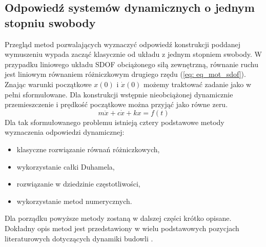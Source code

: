 
\subsection{Odpowiedź systemów dynamicznych o jednym stopniu swobody} \label{section: sdof_response}

Przegląd metod pozwalających wyznaczyć odpowiedź konstrukcji poddanej wymuszeniu wypada zacząć klasycznie od układu z jednym stopniem swobody. W przypadku liniowego układu SDOF obciążonego siłą zewnętrzną, równanie ruchu jest liniowym równaniem różniczkowym drugiego rzędu (\ref{eq: eq_mot_sdof}). Znając warunki początkowe $x(0)$ i $\dot{x}(0)$ możemy traktować zadanie jako w pełni sformułowane. Dla konstrukcji wstępnie nieobciążonej dynamicznie przemieszczenie i prędkość początkowe można przyjąć jako równe zeru.
\begin{equation} \label{eq: eq_mot_sdof}
	m\ddot{x}+c\dot{x}+k{x}=f(t)
\end{equation}
Dla tak sformułowanego problemu istnieją cztery podstawowe metody wyznaczenia odpowiedzi dynamicznej:
\begin{itemize}
	\item klasyczne rozwiązanie równań różniczkowych,
	\item wykorzystanie całki Duhamela,
	\item rozwiązanie w dziedzinie częstotliwości,
	\item wykorzystanie metod numerycznych.
\end{itemize}
Dla porządku powyższe metody zostaną w dalszej części krótko opisane. Dokładny opis metod jest przedstawiony w wielu podstawowych pozycjach literaturowych dotyczących dynamiki budowli \parencite{Clough1975,Chmielewski1998,Chopra2012a}.

